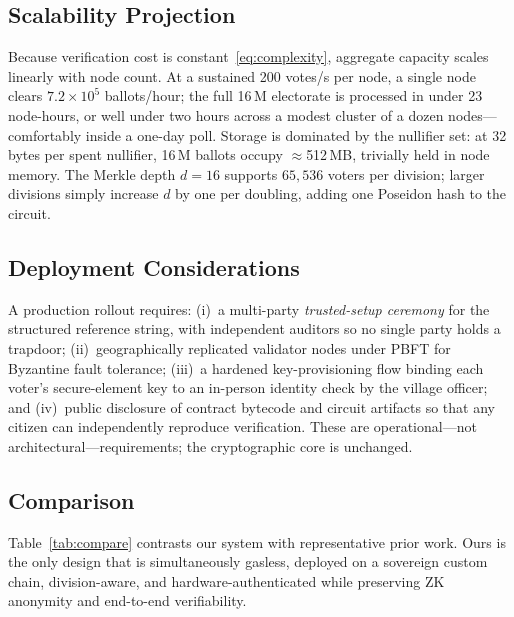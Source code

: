 \documentclass[conference]{IEEEtran}
\theoremstyle{definition}
\theoremstyle{plain}
\begin{document}
\subsection{Scalability Projection}
Because verification cost is constant~\eqref{eq:complexity}, aggregate capacity scales linearly with node count. At a sustained 200 votes/s per node, a single node clears $7.2{\times}10^5$ ballots/hour; the full 16\,M electorate is processed in under 23 node-hours, or well under two hours across a modest cluster of a dozen nodes---comfortably inside a one-day poll. Storage is dominated by the nullifier set: at 32 bytes per spent nullifier, 16\,M ballots occupy $\approx$512\,MB, trivially held in node memory. The Merkle depth $d{=}16$ supports $65{,}536$ voters per division; larger divisions simply increase $d$ by one per doubling, adding one Poseidon hash to the circuit.

\subsection{Deployment Considerations}
A production rollout requires: (i)~a multi-party \emph{trusted-setup ceremony} for the structured reference string, with independent auditors so no single party holds a trapdoor; (ii)~geographically replicated validator nodes under PBFT for Byzantine fault tolerance; (iii)~a hardened key-provisioning flow binding each voter's secure-element key to an in-person identity check by the village officer; and (iv)~public disclosure of contract bytecode and circuit artifacts so that any citizen can independently reproduce verification. These are operational---not architectural---requirements; the cryptographic core is unchanged.

\subsection{Comparison}
Table~\ref{tab:compare} contrasts our system with representative prior work. Ours is the only design that is simultaneously gasless, deployed on a sovereign custom chain, division-aware, and hardware-authenticated while preserving ZK anonymity and end-to-end verifiability.
\end{document}
